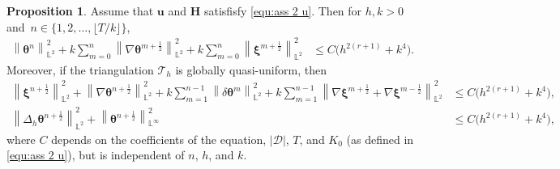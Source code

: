 \documentclass[11pt, reqno]{amsart}
\theoremstyle{definition}
\newtheorem{proposition}[theorem]{Proposition}
\theoremstyle{remark}
\numberwithin{equation}{section}
\newcommand{\bff}{\boldsymbol}
\newcommand{\bb}{\mathbb}
\newcommand{\norm}[2]{\left\|{#1}\right\|_{#2}}
\begin{document}
\begin{proposition}\label{pro:theta xi n half}
Assume that $\bff{u}$ and $\bff{H}$ satisfisfy \eqref{equ:ass 2 u}. Then for $h, k>0$ and~$n\in \{1,2,\ldots,\lfloor T/k \rfloor\}$,
\begin{align}\label{equ:theta n L2}
	\norm{\bff{\theta}^n}{\bb{L}^2}^2
	+
	k \sum_{m=0}^{n} \norm{\nabla \bff{\theta}^{m+\frac{1}{2}}}{\bb{L}^2}^2
	+
	k \sum_{m=0}^{n} \norm{\bff{\xi}^{m+\frac{1}{2}}}{\bb{L}^2}^2
	&\leq
	C \big(h^{2(r+1)}+k^4 \big).
\end{align} 
Moreover, if the triangulation $\mathcal{T}_h$ is globally quasi-uniform, then
\begin{align}
	\label{equ:xi nab theta n L2}
	\norm{\bff{\xi}^{n+\frac{1}{2}}}{\bb{L}^2}^2
	+
	\norm{\nabla \bff{\theta}^{n+\frac{1}{2}}}{\bb{L}^2}^2
	+
	k \sum_{m=1}^{n-1} \norm{\delta \bff{\theta}^m}{\bb{L}^2}^2
	+
	k \sum_{m=1}^{n-1} \norm{\nabla \bff{\xi}^{m+\frac{1}{2}} +\nabla \bff{\xi}^{m-\frac{1}{2}}}{\bb{L}^2}^2
	&\leq
	C \big(h^{2(r+1)}+k^4 \big),
	\\
	\label{equ:Delta theta n L2}
	\norm{\Delta_h \bff{\theta}^{n+\frac{1}{2}}}{\bb{L}^2}^2
	+
	\norm{\bff{\theta}^{n+\frac{1}{2}}}{\bb{L}^\infty}^2
	&\leq
	C \big(h^{2(r+1)}+k^4 \big),
\end{align}
where $C$ depends on the coefficients of the equation, $|\mathscr{D}|$, $T$, and $K_0$ (as defined in \eqref{equ:ass 2 u}), but is independent of $n$, $h$, and $k$.
\end{proposition}
\end{document}
